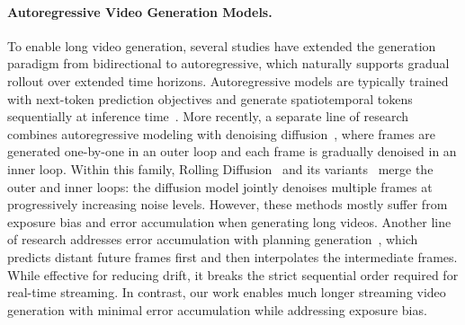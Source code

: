 \paragraph{Autoregressive Video Generation Models.}
To enable long video generation, several studies have extended the generation paradigm from bidirectional to autoregressive, which naturally supports gradual rollout over extended time horizons. Autoregressive models are typically trained with next-token prediction objectives and generate spatiotemporal tokens sequentially at inference time~\citep{bruce2024genie, kondratyuk2023videopoet, wang2024loong, weissenborn2019scaling, yan2021videogpt}. More recently, a separate line of research combines autoregressive modeling with denoising diffusion~\citep{chen2024diffusion, gu2025long, guo2025long, jin2024pyramidal, li2024arlon, liu2024mardini, weng2024art, yin2025slow, zhang2025test, zhang2025packing, huang2025self, henschel2025streamingt2v}, where frames are generated one-by-one in an outer loop and each frame is gradually denoised in an inner loop. Within this family, Rolling Diffusion~\citep{ruhe2024rolling} and its variants~\citep{kim2024fifo, teng2025magi, sun2025ar, xie2025progressive, chen2025skyreels, teng2025magi} merge the outer and inner loops: the diffusion model jointly denoises multiple frames at progressively increasing noise levels. However, these methods mostly suffer from exposure bias and error accumulation when generating long videos. Another line of research addresses error accumulation with planning generation~\citep{long2024videostudio, zhao2024moviedreamer, hu2024storyagent, xie2024dreamfactory, zhang2025packing, bansal2024talc, yang2024synchronized, xiang2025macro}, which predicts distant future frames first and then interpolates the intermediate frames. While effective for reducing drift, it breaks the strict sequential order required for real-time streaming. In contrast, our work enables much longer streaming video generation with minimal error accumulation while addressing exposure bias.



